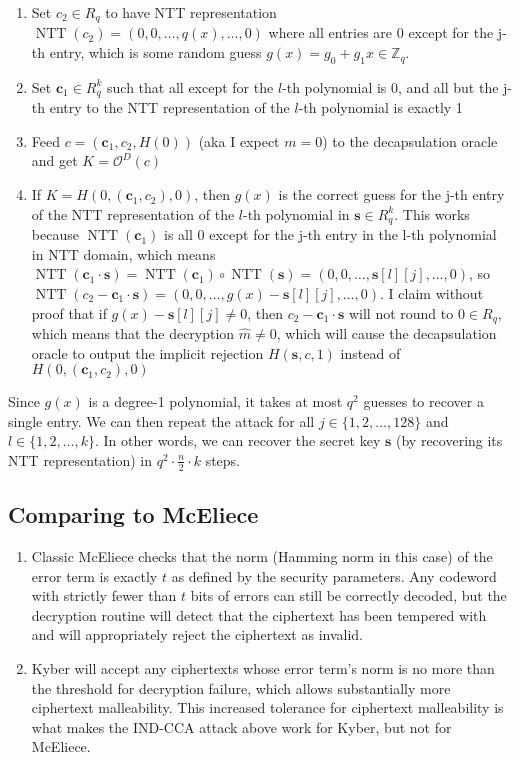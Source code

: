 \documentclass{article}
\begin{document}
\begin{enumerate}
    \item Set $c_2 \in R_q$ to have NTT representation $\operatorname{NTT}(c_2) = (0, 0, \ldots, q(x), \ldots, 0)$ where all entries are 0 except for the j-th entry, which is some random guess $g(x) = g_0 + g_1x \in \mathbb{Z}_q$.
    \item Set $\mathbf{c}_1 \in R_q^k$ such that all except for the $l$-th polynomial is 0, and all but the j-th entry to the NTT representation of the $l$-th polynomial is exactly 1
    \item Feed $c = (\mathbf{c}_1, c_2, H(0))$ (aka I expect $m = 0$) to the decapsulation oracle and get $K = \mathcal{O}^D(c)$
    \item If $K = H(0, (\mathbf{c}_1, c_2), 0)$, then $g(x)$ is the correct guess for the j-th entry of the NTT representation of the $l$-th polynomial in $\mathbf{s} \in R_q^k$. This works because  $\operatorname{NTT}(\mathbf{c}_1)$ is all $0$ except for the j-th entry in the l-th polynomial in NTT domain, which means $\operatorname{NTT}(\mathbf{c}_1 \cdot \mathbf{s}) = \operatorname{NTT}(\mathbf{c}_1) \circ \operatorname{NTT}(\mathbf{s}) = (0, 0, \ldots, \mathbf{s}[l][j], \ldots, 0)$, so $\operatorname{NTT}(c_2 - \mathbf{c}_1 \cdot \mathbf{s}) = (0, 0, \ldots, g(x) - \mathbf{s}[l][j], \ldots, 0)$. I claim without proof that if $g(x) - \mathbf{s}[l][j] \neq 0$, then $c_2 - \mathbf{c}_1 \cdot \mathbf{s}$ will not round to $0 \in R_q$, which means that the decryption $\hat{m} \neq 0$, which will cause the decapsulation oracle to output the implicit rejection $H(\mathbf{s}, c, 1)$ instead of $H(0, (\mathbf{c}_1, c_2), 0)$
\end{enumerate}

Since $g(x)$ is a degree-1 polynomial, it takes at most $q^2$ guesses to recover a single entry. We can then repeat the attack for all $j \in \{1, 2, \ldots, 128\}$ and $l \in \{1, 2, \ldots, k\}$. In other words, we can recover the secret key $\mathbf{s}$ (by recovering its NTT representation) in $q^2 \cdot \frac{n}{2} \cdot k$ steps.

\subsection*{Comparing to McEliece}
\begin{enumerate}
    \item Classic McEliece checks that the norm (Hamming norm in this case) of the error term is exactly $t$ as defined by the security parameters. Any codeword with strictly fewer than $t$ bits of errors can still be correctly decoded, but the decryption routine will detect that the ciphertext has been tempered with and will appropriately reject the ciphertext as invalid.
    \item Kyber will accept any ciphertexts whose error term's norm is no more than the threshold for decryption failure, which allows substantially more ciphertext malleability. This increased tolerance for ciphertext malleability is what makes the IND-CCA attack above work for Kyber, but not for McEliece.
\end{enumerate}
\end{document}
